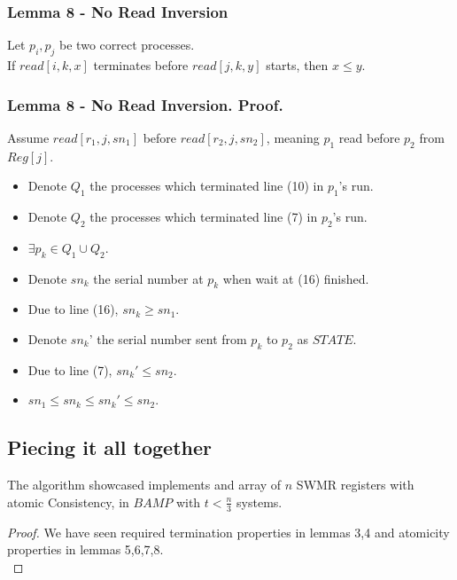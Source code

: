 \begin{frame}
    \frametitle{Lemma 8 - No Read Inversion}
    \begin{lemma}
        Let $p_i, p_j$ be two correct processes.\\
        If $read[i,k,x]$ terminates before $read[j,k,y]$ starts, then $x\leq y$.
    \end{lemma}
\end{frame}
\begin{frame}
    \frametitle{Lemma 8 - No Read Inversion. Proof.}
    Assume $read[r_1,j,sn_1]$ before $read[r_2,j,sn_2]$, meaning $p_1$ read
    before $p_2$ from $Reg[j]$.
    \begin{itemize}
        \item Denote $Q_1$ the processes which terminated line (10) in $p_1$'s run.
        \item Denote $Q_2$ the processes which terminated line (7) in $p_2$'s run.
        \item $\exists p_k\in Q_1\cup Q_2$.
        \item Denote $sn_k$ the serial number at $p_k$ when wait at (16) finished.
        \item Due to line (16), $sn_k\geq sn_1$.
        \item Denote $sn_k$' the serial number sent from $p_k$ to $p_2$ as $STATE$.
        \item Due to line (7), $sn_k'\leq sn_2$.
        \item $sn_1\leq sn_k\leq sn_k'\leq sn_2$.
    \end{itemize}
    
\end{frame}

\subsection{Piecing it all together}
\begin{frame}
    \begin{theorem}
        The algorithm showcased implements and array of $n$ SWMR
        registers with atomic Consistency, in $BAMP$ with $t<\frac{n}{3}$ systems.
    \end{theorem}
    \begin{proof}
        We have seen required termination properties in lemmas 3,4 and atomicity
        properties in lemmas 5,6,7,8.\\
    \end{proof}
\end{frame}

